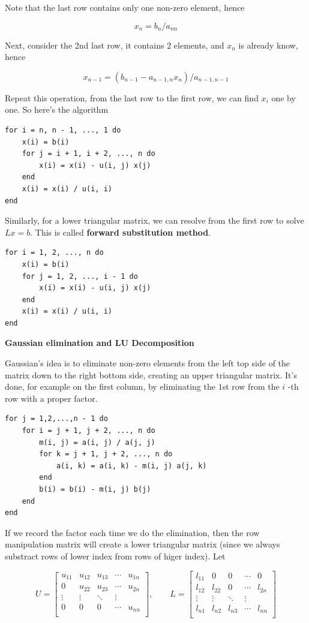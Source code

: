 \documentclass[11pt]{article}
\begin{document}
Note that the last row contains only one non-zero element, hence

\[x_{n} = b_{n} / a_{nn}\]

Next, consider the 2nd last row, it contains 2 elements, and \(x_n\) is
already know, hence

\[x_{n-1} = (b_{n-1} - a_{n-1,n}x_{n}) / a_{n-1,n-1}\]

Repeat this operation, from the last row to the first row, we can find
\(x_i\) one by one. So here's the algorithm

\begin{verbatim}
for i = n, n - 1, ..., 1 do
    x(i) = b(i)
    for j = i + 1, i + 2, ..., n do
        x(i) = x(i) - u(i, j) x(j)
    end
    x(i) = x(i) / u(i, i)
end
\end{verbatim}

Similarly, for a lower triangular matrix, we can resolve from the first
row to solve \(Lx=b\). This is called \textbf{forward substitution
method}.

\begin{verbatim}
for i = 1, 2, ..., n do
    x(i) = b(i)
    for j = 1, 2, ..., i - 1 do
        x(i) = x(i) - u(i, j) x(j)
    end
    x(i) = x(i) / u(i, i)
end
\end{verbatim}

\textbf{Gaussian elimination and LU Decomposition}

Gaussian's idea is to eliminate non-zero elements from the left top side
of the matrix down to the right bottom side, creating an upper
triangular matrix. It's done, for example on the first column, by
eliminating the \(1\)st row from the \(i\) -th row with a proper factor.

\begin{verbatim}
for j = 1,2,...,n - 1 do
    for i = j + 1, j + 2, ..., n do
        m(i, j) = a(i, j) / a(j, j)
        for k = j + 1, j + 2, ..., n do
            a(i, k) = a(i, k) - m(i, j) a(j, k)
        end
        b(i) = b(i) - m(i, j) b(j)
    end
end
\end{verbatim}

If we record the factor each time we do the elimination, then the row
manipulation matrix will create a lower triangular matrix (since we
always substract rows of lower index from rows of higer index). Let

\[
U=\begin{bmatrix} u_{11} & u_{12} & u_{13} & \cdots & u_{1n}\\
0 & u_{22} & u_{23} & \cdots & u_{2n}\\
\vdots & \vdots & \ddots & \vdots\\
0&0 & 0&\cdots & u_{nn}\\
\end{bmatrix}, \qquad L=\begin{bmatrix} l_{11} & 0 & 0 & \cdots & 0\\
l_{12} & l_{22} & 0 & \cdots & l_{2n}\\
\vdots & \vdots & \ddots & \vdots\\
l_{n1}&l_{n2} & l_{n3}&\cdots & l_{nn}\\
\end{bmatrix} \]
\end{document}
